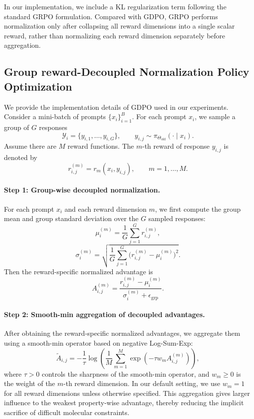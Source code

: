 \documentclass[11pt]{article}
\begin{document}
In our implementation, we include a KL regularization term following the standard GRPO formulation.
Compared with GDPO, GRPO performs normalization only after collapsing all reward dimensions into a single scalar reward, rather than normalizing each reward dimension separately before aggregation.

\subsection{Group reward-Decoupled Normalization
Policy Optimization}
\label{appendix:gdpo_implementation}

We provide the implementation details of GDPO used in our experiments.
Consider a mini-batch of prompts $\{x_i\}_{i=1}^{B}$.
For each prompt $x_i$, we sample a group of $G$ responses
\[
\mathcal{Y}_i = \{y_{i,1}, \dots, y_{i,G}\}, \qquad
y_{i,j} \sim \pi_{\Theta_{\mathrm{old}}}(\cdot \mid x_i).
\]
Assume there are $M$ reward functions.
The $m$-th reward of response $y_{i,j}$ is denoted by
\[
r_{i,j}^{(m)} = r_m(x_i, y_{i,j}), \qquad m = 1, \dots, M.
\]

\paragraph{Step 1: Group-wise decoupled normalization.}
For each prompt $x_i$ and each reward dimension $m$, we first compute the
group mean and group standard deviation over the $G$ sampled responses:
\[
\mu_i^{(m)} = \frac{1}{G} \sum_{j=1}^{G} r_{i,j}^{(m)},
\]
\[
\sigma_i^{(m)} =
\sqrt{
\frac{1}{G} \sum_{j=1}^{G} \bigl(r_{i,j}^{(m)} - \mu_i^{(m)}\bigr)^2
}.
\]
Then the reward-specific normalized advantage is
\[
A_{i,j}^{(m)} =
\frac{r_{i,j}^{(m)} - \mu_i^{(m)}}{\sigma_i^{(m)} + \epsilon_{\mathrm{grp}}}.
\]

\paragraph{Step 2: Smooth-min aggregation of decoupled advantages.}
After obtaining the reward-specific normalized advantages, we aggregate them using a smooth-min operator based on negative Log-Sum-Exp:
\begin{equation}
\tilde{A}_{i,j}
=
-\frac{1}{\tau}
\log
\left(
\frac{1}{M}
\sum_{m=1}^{M}
\exp\left(-\tau w_m A^{(m)}_{i,j}\right)
\right),
\end{equation}
where $\tau>0$ controls the sharpness of the smooth-min operator, and $w_m \ge 0$ is the weight of the $m$-th reward dimension. In our default setting, we use $w_m=1$ for all reward dimensions unless otherwise specified. This aggregation gives larger influence to the weakest property-wise advantage, thereby reducing the implicit sacrifice of difficult molecular constraints.
\end{document}
